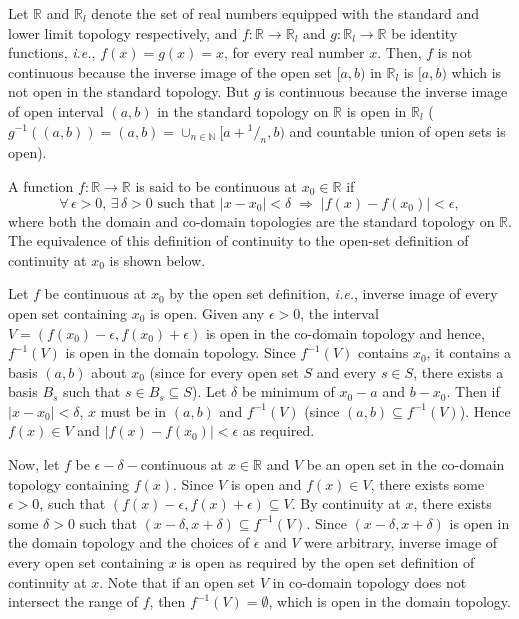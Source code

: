 \documentclass[a4paper,english,12pt]{article}
\begin{document}
\begin{exmp}
Let $\mathbb{R}$ and $\mathbb{R}_l$ denote the set of real numbers equipped with the standard and lower limit topology respectively, and $f:\mathbb{R}\rightarrow \mathbb{R}_l$ and $g:\mathbb{R}_l\rightarrow \mathbb{R}$ be identity functions, \emph{i.e.}, $f(x)=g(x)=x$, for every real number $x$. Then, $f$ is not continuous because the inverse image of the open set $[a,b)$ in $\mathbb{R}_l$ is $[a,b)$ which is not open in the standard topology. But $g$ is continuous because the inverse image of open interval $(a,b)$ in the standard topology on $\mathbb{R}$ is open in $\mathbb{R}_l$ ($g^{-1}((a,b))=(a,b)=\cup _{n\in \mathbb{N}}[a+\!^1/_n,b)$ and countable union of open sets is open).
\label{lower_lt}
\end{exmp}

\begin{exmp}
A function $f:\mathbb{R}\rightarrow \mathbb{R}$ is said to be continuous at $x_0\in \mathbb{R}$ if 
\begin{equation*}
\forall\,\epsilon>0,\,\exists\,\delta>0 \text{ such that } |x-x_0|<\delta\;\Rightarrow\;|f(x)-f(x_0)|<\epsilon,
\end{equation*}
where both the domain and co-domain topologies are the standard topology on $\mathbb{R}$. The equivalence of this definition of continuity to the open-set definition of continuity at $x_0$ is shown below.

Let $f$ be continuous at $x_0$ by the open set definition, \emph{i.e.}, inverse image of every open set containing $x_0$ is open. Given any $\epsilon>0$, the interval $V=(f(x_0)-\epsilon,f(x_0)+\epsilon)$ is open in the co-domain topology and hence, $f^{-1}(V)$ is open in the domain topology. Since $f^{-1}(V)$ contains $x_0$, it contains a basis $(a,b)$ about $x_0$ (since for every open set $S$ and every $s\in S$, there exists a basis $B_s$ such that $s\in B_s\subseteq S$). Let $\delta$ be minimum of $x_0-a$ and $b-x_0$. Then if $|x-x_0|<\delta$, $x$ must be in $(a,b)$ and $f^{-1}(V)$ (since $(a,b)\subseteq f^{-1}(V)$). Hence $f(x)\in V$ and $|f(x)-f(x_0)|<\epsilon$ as required.

Now, let $f$ be $\epsilon-\delta-$continuous at $x\in \mathbb{R}$ and $V$ be an open set in the co-domain topology containing $f(x)$. Since $V$ is open and $f(x)\in V$, there exists some $\epsilon>0$, such that $(f(x)-\epsilon,f(x)+\epsilon)\subseteq V$. By continuity at $x$, there exists some $\delta>0$ such that $(x-\delta,x+\delta)\subseteq f^{-1}(V)$. Since $(x-\delta,x+\delta)$ is open in the domain topology and the choices of $\epsilon$ and $V$ were arbitrary, inverse image of every open set containing $x$ is open as required by the open set definition of continuity at $x$. Note that if an open set $V$ in co-domain topology does not intersect the range of $f$, then $f^{-1}(V)=\emptyset$, which is open in the domain topology. 
\end{exmp}
\end{document}
